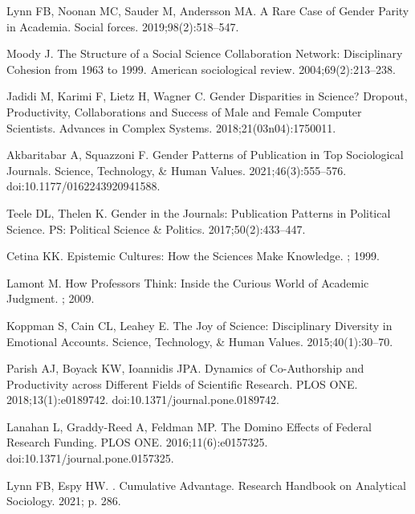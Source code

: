 \documentclass[
  10pt,
  letterpaper,
]{article}
\begin{document}
\begin{thebibliography}{10}
Lynn FB, Noonan MC, Sauder M, Andersson MA.
\newblock A Rare Case of Gender Parity in Academia.
\newblock Social forces. 2019;98(2):518--547.

Moody J.
\newblock The Structure of a Social Science Collaboration Network: {{Disciplinary}} Cohesion from 1963 to 1999.
\newblock American sociological review. 2004;69(2):213--238.

Jadidi M, Karimi F, Lietz H, Wagner C.
\newblock Gender Disparities in Science? {{Dropout}}, Productivity, Collaborations and Success of Male and Female Computer Scientists.
\newblock Advances in Complex Systems. 2018;21(03n04):1750011.

Akbaritabar A, Squazzoni F.
\newblock Gender {{Patterns}} of {{Publication}} in {{Top Sociological Journals}}.
\newblock Science, Technology, \& Human Values. 2021;46(3):555--576.
\newblock doi:{10.1177/0162243920941588}.

Teele DL, Thelen K.
\newblock Gender in the Journals: {{Publication}} Patterns in Political Science.
\newblock PS: Political Science \& Politics. 2017;50(2):433--447.

Cetina KK.
\newblock Epistemic {{Cultures}}: {{How}} the {{Sciences Make Knowledge}}.
; 1999.

Lamont M.
\newblock How {{Professors Think}}: {{Inside}} the {{Curious World}} of {{Academic Judgment}}.
; 2009.

Koppman S, Cain CL, Leahey E.
\newblock The Joy of Science: {{Disciplinary}} Diversity in Emotional Accounts.
\newblock Science, Technology, \& Human Values. 2015;40(1):30--70.

Parish AJ, Boyack KW, Ioannidis JPA.
\newblock Dynamics of Co-Authorship and Productivity across Different Fields of Scientific Research.
\newblock PLOS ONE. 2018;13(1):e0189742.
\newblock doi:{10.1371/journal.pone.0189742}.

Lanahan L, {Graddy-Reed} A, Feldman MP.
\newblock The {{Domino Effects}} of {{Federal Research Funding}}.
\newblock PLOS ONE. 2016;11(6):e0157325.
\newblock doi:{10.1371/journal.pone.0157325}.

Lynn FB, Espy HW.
. {{Cumulative}} Advantage.
\newblock Research Handbook on Analytical Sociology. 2021; p. 286.


\end{thebibliography}
\end{document}
